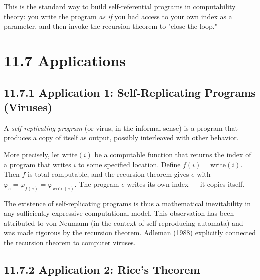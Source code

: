This is the standard way to build self-referential programs in computability theory: you write the program \textit{as if} you had access to your own index as a parameter, and then invoke the recursion theorem to "close the loop."

\section{11.7 Applications}

\subsection{11.7.1 Application 1: Self-Replicating Programs (Viruses)}

A \textit{self-replicating program} (or virus, in the informal sense) is a program that produces a copy of itself as output, possibly interleaved with other behavior.

More precisely, let $\text{write}(i)$ be a computable function that returns the index of a program that writes $i$ to some specified location. Define $f(i) = \text{write}(i)$. Then $f$ is total computable, and the recursion theorem gives $e$ with $\varphi_e = \varphi_{f(e)} = \varphi_{\text{write}(e)}$. The program $e$ writes its own index --- it copies itself.

The existence of self-replicating programs is thus a mathematical inevitability in any sufficiently expressive computational model. This observation has been attributed to von Neumann (in the context of self-reproducing automata) and was made rigorous by the recursion theorem. Adleman (1988) explicitly connected the recursion theorem to computer viruses.

\subsection{11.7.2 Application 2: Rice's Theorem}

